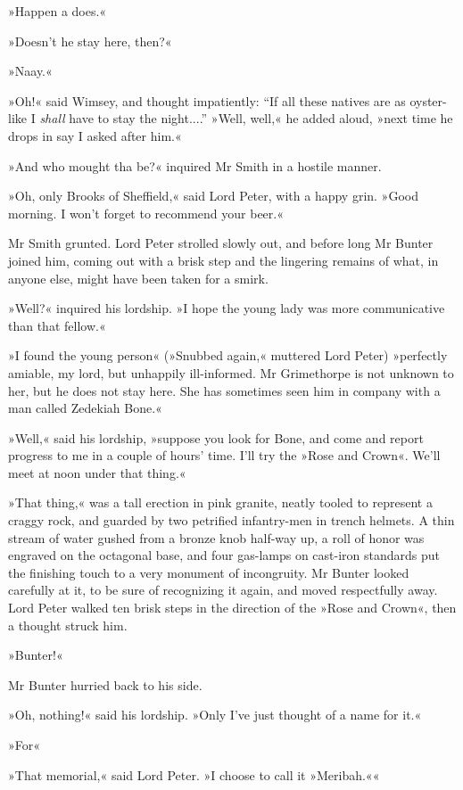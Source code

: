 »Happen a does.«

»Doesn't he stay here, then?«

»Naay.«

»Oh!« said Wimsey, and thought impatiently: \enquote{If all these natives are as oyster-like I \textit{shall} have to stay the night....} »Well, well,« he added aloud, »next time he drops in say I asked after him.«

»And who mought tha be?« inquired Mr Smith in a hostile manner.

»Oh, only Brooks of Sheffield,« said Lord Peter, with a happy grin. »Good morning. I won't forget to recommend your beer.«

Mr Smith grunted. Lord Peter strolled slowly out, and before long Mr Bunter joined him, coming out with a brisk step and the lingering remains of what, in anyone else, might have been taken for a smirk.

»Well?« inquired his lordship. »I hope the young lady was more communicative than that fellow.«

»I found the young person« (»Snubbed again,« muttered Lord Peter) »perfectly amiable, my lord, but unhappily ill-informed. Mr Grimethorpe is not unknown to her, but he does not stay here. She has sometimes seen him in company with a man called Zedekiah Bone.«

»Well,« said his lordship, »suppose you look for Bone, and come and report progress to me in a couple of hours' time. I'll try the »Rose and Crown«. We'll meet at noon under that thing.«

»That thing,« was a tall erection in pink granite, neatly tooled to represent a craggy rock, and guarded by two petrified infantry-men in trench helmets. A thin stream of water gushed from a bronze knob half-way up, a roll of honor was engraved on the octagonal base, and four gas-lamps on cast-iron standards put the finishing touch to a very monument of incongruity. Mr Bunter looked carefully at it, to be sure of recognizing it again, and moved respectfully away. Lord Peter walked ten brisk steps in the direction of the »Rose and Crown«, then a thought struck him.

»Bunter!«

Mr Bunter hurried back to his side.

»Oh, nothing!« said his lordship. »Only I've just thought of a name for it.«

»For\longdash«

»That memorial,« said Lord Peter. »I choose to call it »Meribah.««

